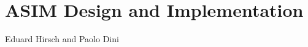 \chapter{ASIM Design and Implementation}
\label{ch:design}

\vspace{-1cm}
\begin{center}
Eduard Hirsch and Paolo Dini
\end{center}

